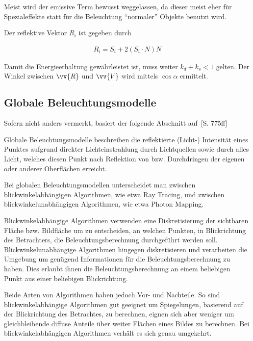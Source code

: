 Meist wird der emissive Term bewusst weggelassen, da dieser meist eher für
Spezialeffekte statt für die Beleuchtung ``normaler'' Objekte benutzt wird.

Der reflektive Vektor $R_{i}$ ist gegeben durch

\begin{gather}
    R_{i} = S_{i} + 2(S_{i} \cdot N)N
\end{gather}

Damit die Energieerhaltung gewährleistet ist, muss weiter $k_{d} + k_{s} < 1$
gelten. Der Winkel zwischen $\vv{R}$ und $\vv{V}$ wird mittels $\cos{\alpha}$
ermittelt.


\subsection{Globale Beleuchtungsmodelle}
\label{subsec:global_illumination_models}

Sofern nicht anders vermerkt, basiert der folgende Abschnitt auf~\cite{foley_computer_1996}[S. 775ff]

Globale Beleuchtungsmodelle beschreiben die reflektierte (Licht-) Intensität
eines Punktes aufgrund direkter Lichteinstrahlung durch Lichtquellen sowie
durch alles Licht, welches diesen Punkt nach Reflektion von bzw. Durchdringen
der eigenen oder anderer Oberflächen erreicht.

Bei globalen Beleuchtungsmodellen unterscheidet man zwischen
blickwinkelabhängigen Algorithmen, wie etwa Ray Tracing, und zwischen
blickwinkelunabhängigen Algorithmen, wie etwa Photon Mapping.

Blickwinkelabhängige Algorithmen verwenden eine Diskretisierung der sichtbaren
Fläche bzw. Bildfläche um zu entscheiden, an welchen Punkten, in Blickrichtung
des Betrachters, die Beleuchtungsberechnung durchgeführt werden soll.
Blickwinkelunabhängige Algorithmen hingegen diskretisieren und verarbeiten die
Umgebung um genügend Informationen für die Beleuchtungsberechnung zu haben.
Dies erlaubt ihnen die Beleuchtungsberechnung an einem beliebigen Punkt aus
einer beliebigen Blickrichtung.

Beide Arten von Algorithmen haben jedoch Vor- und Nachteile. So sind
blickwinkelabhängige Algorithmen gut geeignet um Spiegelungen, basierend auf
der Blickrichtung des Betrachtes, zu berechnen, eignen sich aber weniger um
gleichbleibende diffuse Anteile über weiter Flächen eines Bildes zu berechnen.
Bei blickwinkelabhängigen Algorithmen verhält es sich genau umgekehrt.

